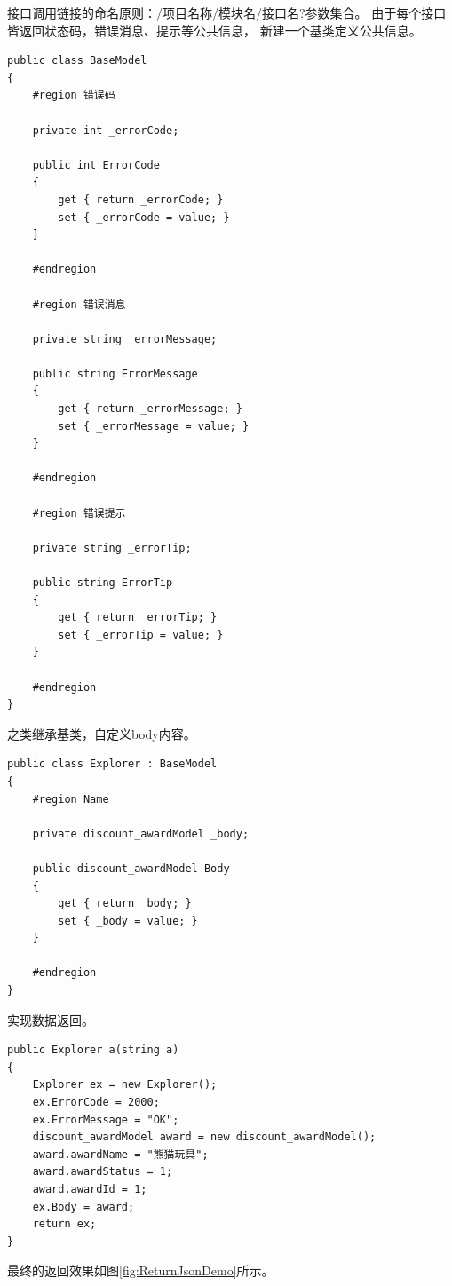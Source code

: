 \documentclass{book}
\begin{document}
接口调用链接的命名原则：/项目名称/模块名/接口名?{参数集合}。
由于每个接口皆返回状态码，错误消息、提示等公共信息，
新建一个基类定义公共信息。

\begin{lstlisting}[language={[Sharp]C}]
public class BaseModel
{
    #region 错误码

    private int _errorCode;

    public int ErrorCode
    {
        get { return _errorCode; }
        set { _errorCode = value; }
    }

    #endregion

    #region 错误消息

    private string _errorMessage;

    public string ErrorMessage
    {
        get { return _errorMessage; }
        set { _errorMessage = value; }
    }

    #endregion

    #region 错误提示

    private string _errorTip;

    public string ErrorTip
    {
        get { return _errorTip; }
        set { _errorTip = value; }
    }

    #endregion        
}
\end{lstlisting}

之类继承基类，自定义body内容。

\begin{lstlisting}[language={[Sharp]C}]
 public class Explorer : BaseModel
{
    #region Name

    private discount_awardModel _body;

    public discount_awardModel Body
    {
        get { return _body; }
        set { _body = value; }
    }

    #endregion
}
\end{lstlisting}

实现数据返回。

\begin{lstlisting}[language={[Sharp]C}]
public Explorer a(string a)
{
    Explorer ex = new Explorer();
    ex.ErrorCode = 2000;
    ex.ErrorMessage = "OK";
    discount_awardModel award = new discount_awardModel();
    award.awardName = "熊猫玩具";
    award.awardStatus = 1;
    award.awardId = 1;
    ex.Body = award;
    return ex;
}
\end{lstlisting}

最终的返回效果如图\ref{fig:ReturnJsonDemo}所示。
\end{document}
